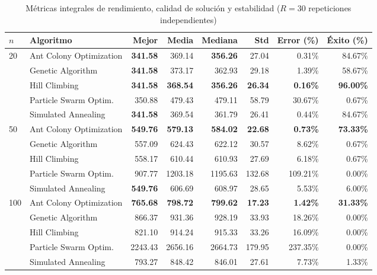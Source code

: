 \documentclass[11pt, a4paper]{article}
\begin{document}
\begin{table}[htbp]
\centering
\caption{Métricas integrales de rendimiento, calidad de solución y estabilidad ($R=30$ repeticiones independientes)}
\label{tab:rendimiento_global}
\small
\begin{tabularx}{\textwidth}{llrrrrrr}
\toprule
\textbf{$n$} & \textbf{Algoritmo} & \textbf{Mejor} & \textbf{Media} & \textbf{Mediana} & \textbf{Std} & \textbf{Error (\%)} & \textbf{Éxito (\%)} \\
\midrule
\multirow{5}{*}{20} 
 & Ant Colony Optimization & \textbf{341.58} & 369.14 & \textbf{356.26} & 27.04 & 0.31\% & 84.67\% \\
 & Genetic Algorithm       & \textbf{341.58} & 373.17 & 362.93 & 29.18 & 1.39\% & 58.67\% \\
 & Hill Climbing           & \textbf{341.58} & \textbf{368.54} & \textbf{356.26} & \textbf{26.34} & \textbf{0.16\%} & \textbf{96.00\%} \\
 & Particle Swarm Optim.   & 350.88 & 479.43 & 479.11 & 58.79 & 30.67\% & 0.67\% \\
 & Simulated Annealing     & \textbf{341.58} & 369.54 & 361.79 & 26.41 & 0.44\% & 84.67\% \\
\midrule
\multirow{5}{*}{50} 
 & Ant Colony Optimization & \textbf{549.76} & \textbf{579.13} & \textbf{584.02} & \textbf{22.68} & \textbf{0.73\%} & \textbf{73.33\%} \\
 & Genetic Algorithm       & 557.09 & 624.43 & 622.12 & 30.57 & 8.62\% & 0.67\% \\
 & Hill Climbing           & 558.17 & 610.44 & 610.93 & 27.69 & 6.18\% & 0.67\% \\
 & Particle Swarm Optim.   & 907.77 & 1203.18 & 1195.63 & 132.68 & 109.21\% & 0.00\% \\
 & Simulated Annealing     & \textbf{549.76} & 606.69 & 608.97 & 28.65 & 5.53\% & 6.00\% \\
\midrule
\multirow{5}{*}{100} 
 & Ant Colony Optimization & \textbf{765.68} & \textbf{798.72} & \textbf{799.62} & \textbf{17.23} & \textbf{1.42\%} & \textbf{31.33\%} \\
 & Genetic Algorithm       & 866.37 & 931.36 & 928.19 & 33.93 & 18.26\% & 0.00\% \\
 & Hill Climbing           & 821.10 & 914.24 & 915.33 & 33.26 & 16.09\% & 0.00\% \\
 & Particle Swarm Optim.   & 2243.43 & 2656.16 & 2664.73 & 179.95 & 237.35\% & 0.00\% \\
 & Simulated Annealing     & 793.27 & 848.42 & 846.01 & 27.61 & 7.73\% & 1.33\% \\
\bottomrule
\end{tabularx}
\end{table}
\end{document}
